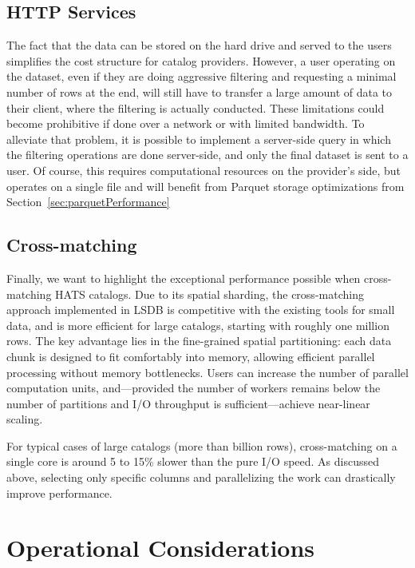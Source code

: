 \documentclass[11pt,a4paper]{ivoa}
\begin{document}
\subsection{HTTP Services}
The fact that the data can be stored on the hard drive and served to the users simplifies the cost structure for catalog providers. 
However, a user operating on the dataset, even if they are doing aggressive filtering and requesting a minimal number of rows at the end, will still have to transfer a large amount of data to their client, where the filtering is actually conducted. 
These limitations could become prohibitive if done over a network or with limited bandwidth. 
To alleviate that problem, it is possible to implement a server-side query in which the filtering operations are done server-side, and only the final dataset is sent to a user. 
Of course, this requires computational resources on the provider's side, but operates on a single file and will benefit from Parquet storage optimizations from Section~\ref{sec:parquetPerformance}

\subsection{Cross-matching}
Finally, we want to highlight the exceptional performance possible when cross-matching HATS catalogs. 
Due to its spatial sharding, the cross-matching approach implemented in LSDB is competitive with the existing tools for small data, and is more efficient for large catalogs, starting with roughly one million rows. 
The key advantage lies in the fine-grained spatial partitioning: each data chunk is designed to fit comfortably into memory, allowing efficient parallel processing without memory bottlenecks. Users can increase the number of parallel computation units, and—provided the number of workers remains below the number of partitions and I/O throughput is sufficient—achieve near-linear scaling. \par 

For typical cases of large catalogs (more than billion rows), cross-matching on a single core is around 5 to 15\% slower than the pure I/O speed. 
As discussed above, selecting only specific columns and parallelizing the work can drastically improve performance.   

\section{Operational Considerations}
\end{document}
